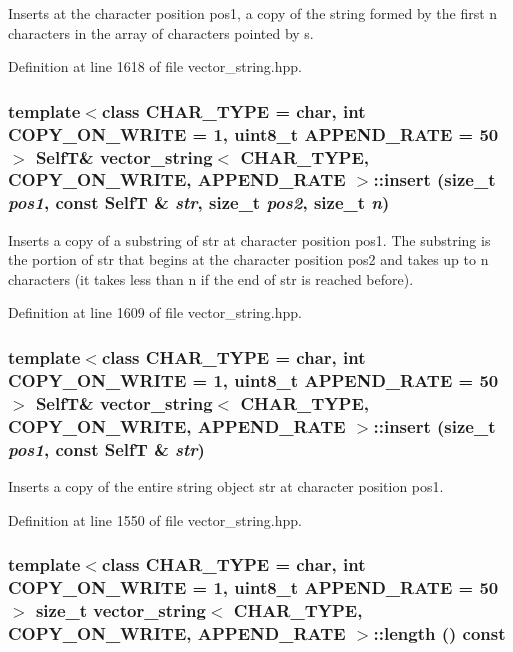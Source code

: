Inserts at the character position pos1, a copy of the string formed by the first n characters in the array of characters pointed by s. 

Definition at line 1618 of file vector\_\-string.hpp.\hypertarget{classvector__string_9cf16247816c7d93ecffc2b41f8cba4a}{
\subsubsection[{insert}]{\setlength{\rightskip}{0pt plus 5cm}template$<$class CHAR\_\-TYPE  = char, int COPY\_\-ON\_\-WRITE = 1, uint8\_\-t APPEND\_\-RATE = 50$>$ {\bf SelfT}\& {\bf vector\_\-string}$<$ CHAR\_\-TYPE, COPY\_\-ON\_\-WRITE, APPEND\_\-RATE $>$::insert (size\_\-t {\em pos1}, \/  const {\bf SelfT} \& {\em str}, \/  size\_\-t {\em pos2}, \/  size\_\-t {\em n})}}
\label{classvector__string_9cf16247816c7d93ecffc2b41f8cba4a}


Inserts a copy of a substring of str at character position pos1. The substring is the portion of str that begins at the character position pos2 and takes up to n characters (it takes less than n if the end of str is reached before). 

Definition at line 1609 of file vector\_\-string.hpp.\hypertarget{classvector__string_601a84cd50754d049e8bdb9d54242913}{
\subsubsection[{insert}]{\setlength{\rightskip}{0pt plus 5cm}template$<$class CHAR\_\-TYPE  = char, int COPY\_\-ON\_\-WRITE = 1, uint8\_\-t APPEND\_\-RATE = 50$>$ {\bf SelfT}\& {\bf vector\_\-string}$<$ CHAR\_\-TYPE, COPY\_\-ON\_\-WRITE, APPEND\_\-RATE $>$::insert (size\_\-t {\em pos1}, \/  const {\bf SelfT} \& {\em str})}}
\label{classvector__string_601a84cd50754d049e8bdb9d54242913}


Inserts a copy of the entire string object str at character position pos1. 

Definition at line 1550 of file vector\_\-string.hpp.\hypertarget{classvector__string_bed831c659ff65631f4f15212f1f1537}{
\subsubsection[{length}]{\setlength{\rightskip}{0pt plus 5cm}template$<$class CHAR\_\-TYPE  = char, int COPY\_\-ON\_\-WRITE = 1, uint8\_\-t APPEND\_\-RATE = 50$>$ size\_\-t {\bf vector\_\-string}$<$ CHAR\_\-TYPE, COPY\_\-ON\_\-WRITE, APPEND\_\-RATE $>$::length () const}}
\label{classvector__string_bed831c659ff65631f4f15212f1f1537}


